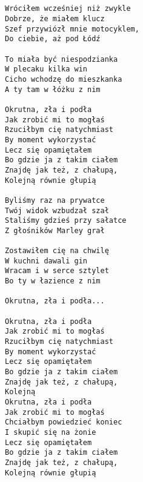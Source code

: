 \documentclass[12pt]{article}
\begin{document}
\subsection*{}
\begin{verbatim}
Wróciłem wcześniej niż zwykle
Dobrze, że miałem klucz
Szef przywiózł mnie motocyklem,
Do ciebie, aż pod Łódź

To miała być niespodzianka
W plecaku kilka win
Cicho wchodzę do mieszkanka
A ty tam w łóżku z nim

Okrutna, zła i podła
Jak zrobić mi to mogłaś
Rzuciłbym cię natychmiast
By moment wykorzystać
Lecz się opamiętałem
Bo gdzie ja z takim ciałem
Znajdę jak też, z chałupą,
Kolejną równie głupią

Byliśmy raz na prywatce
Twój widok wzbudzał szał
Staliśmy gdzieś przy sałatce
Z głośników Marley grał

Zostawiłem cię na chwilę
W kuchni dawali gin
Wracam i w serce sztylet
Bo ty w łazience z nim

Okrutna, zła i podła...

Okrutna, zła i podła
Jak zrobić mi to mogłaś
Rzuciłbym cię natychmiast
By moment wykorzystać
Lecz się opamiętałem
Bo gdzie ja z takim ciałem
Znajdę jak też, z chałupą,
Kolejną
Okrutna, zła i podła
Jak zrobić mi to mogłaś
Chciałbym powiedzieć koniec
I skupić się na żonie
Lecz się opamiętałem
Bo gdzie ja z takim ciałem
Znajdę jak też, z chałupą,
Kolejną równie głupią
\end{verbatim}
\clearpage
\end{document}
